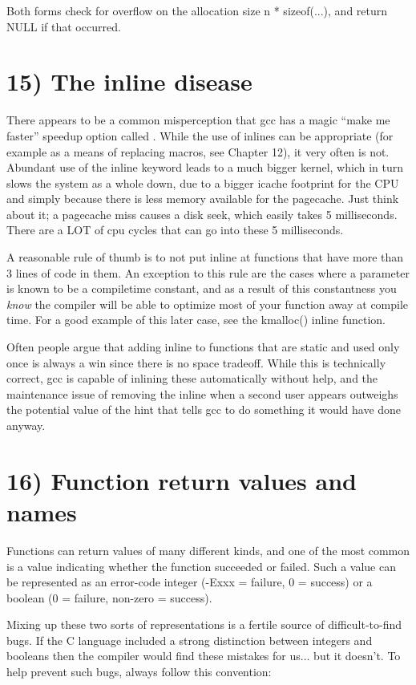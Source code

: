 \documentclass[a4paper,8pt,english]{sphinxmanual}
\begin{document}
Both forms check for overflow on the allocation size n * sizeof(...),
and return NULL if that occurred.


\section{15) The inline disease}
\label{process/coding-style:the-inline-disease}
There appears to be a common misperception that gcc has a magic ``make me
faster'' speedup option called . While the use of inlines can be
appropriate (for example as a means of replacing macros, see Chapter 12), it
very often is not. Abundant use of the inline keyword leads to a much bigger
kernel, which in turn slows the system as a whole down, due to a bigger
icache footprint for the CPU and simply because there is less memory
available for the pagecache. Just think about it; a pagecache miss causes a
disk seek, which easily takes 5 milliseconds. There are a LOT of cpu cycles
that can go into these 5 milliseconds.

A reasonable rule of thumb is to not put inline at functions that have more
than 3 lines of code in them. An exception to this rule are the cases where
a parameter is known to be a compiletime constant, and as a result of this
constantness you \emph{know} the compiler will be able to optimize most of your
function away at compile time. For a good example of this later case, see
the kmalloc() inline function.

Often people argue that adding inline to functions that are static and used
only once is always a win since there is no space tradeoff. While this is
technically correct, gcc is capable of inlining these automatically without
help, and the maintenance issue of removing the inline when a second user
appears outweighs the potential value of the hint that tells gcc to do
something it would have done anyway.


\section{16) Function return values and names}
\label{process/coding-style:function-return-values-and-names}
Functions can return values of many different kinds, and one of the
most common is a value indicating whether the function succeeded or
failed.  Such a value can be represented as an error-code integer
(-Exxx = failure, 0 = success) or a  boolean (0 = failure,
non-zero = success).

Mixing up these two sorts of representations is a fertile source of
difficult-to-find bugs.  If the C language included a strong distinction
between integers and booleans then the compiler would find these mistakes
for us... but it doesn't.  To help prevent such bugs, always follow this
convention:
\end{document}
